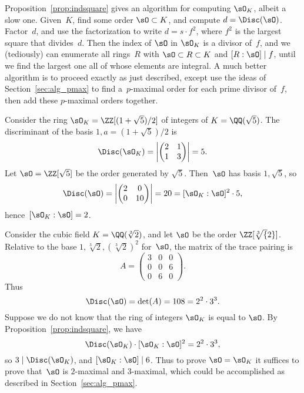Proposition~\ref{prop:indsquare} gives an algorithm for computing $\sO_K$,
albeit a  slow one.  Given~$K$, find some order $\sO\subset
K$, and compute $d=\Disc(\sO)$.  Factor~$d$, and use the factorization
to write $d=s\cdot f^2$, where $f^2$ is the largest square that
divides~$d$.  Then the index of $\sO$ in $\sO_K$ is a divisor of~$f$,
and we (tediously) can enumerate all rings~$R$ with $\sO\subset
R\subset K$ and $[R:\sO] \mid f$, until we find the largest one all of
whose elements are integral.  A much better algorithm is to proceed
exactly as just described, except use the ideas
of Section~\ref{sec:alg_pmax} to find a~$p$-maximal order for each prime
divisor of~$f$, then add these $p$-maximal orders together.

\begin{example}
  Consider the ring $\sO_K = \ZZ[(1+\sqrt{5})/2]$ of integers of
  $K=\QQ(\sqrt{5})$.  The discriminant of the basis $1,a=(1+\sqrt{5})/2$
  is
  \[
  \Disc(\sO_K) = \left| \begin{pmatrix} 2 & 1 \\ 1 & 3\end{pmatrix} \right| = 5.
  \]
  Let $\sO=\ZZ[\sqrt{5}]$ be the order generated by $\sqrt{5}$.
  Then~$\sO$ has basis $1,\sqrt{5}$, so
  \[
  \Disc(\sO) = \left| \begin{pmatrix} 2 & 0 \\ 0 & 10\end{pmatrix} \right| = 20 = [\sO_K:\sO]^2\cdot 5,
  \]
  hence~$[\sO_K:\sO] = 2$.
\end{example}

\begin{example}
  Consider the cubic field $K=\QQ(\sqrt[3]{2})$, and
  let $\sO$ be the order $\ZZ[\sqrt[3]{2}]$.
  Relative to the base $1,\sqrt[3]{2}, (\sqrt[3]{2})^2$ for~$\sO$,
  the matrix of the trace pairing is
  \[
    A = \begin{pmatrix}
     3 & 0 & 0 \\
     0 & 0 & 6 \\
     0 & 6 & 0
    \end{pmatrix}.
  \]
  Thus
  \[
    \Disc(\sO) = \det(A)= 108 = 2^2\cdot 3^3.
  \]
  Suppose we do not know that the ring of integers
  $\sO_K$ is equal to $\sO$.  By Proposition~\ref{prop:indsquare},
  we  have
  \[
    \Disc(\sO_K)\cdot [\sO_K:\sO]^2 = 2^2\cdot 3^3,
  \]
  so $3\mid \Disc(\sO_K)$, and $[\sO_K:\sO] \mid 6$.
  Thus to prove $\sO=\sO_K$ it suffices to prove
  that~$\sO$ is $2$-maximal and $3$-maximal,
  which could be accomplished as described in
  Section~\ref{sec:alg_pmax}.
\end{example}

